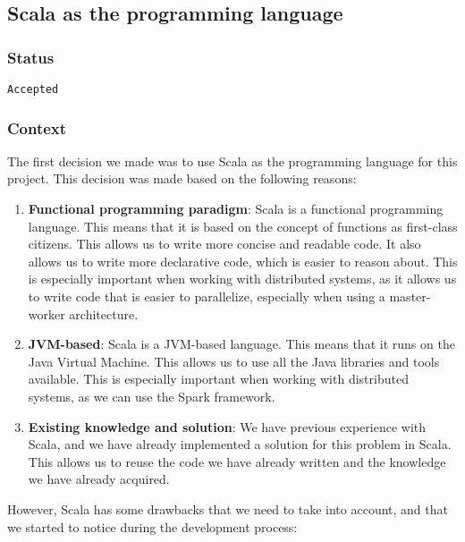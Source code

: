 \subsection{Scala as the programming language}

\subsubsection{Status}

\texttt{Accepted}

\subsubsection{Context}

The first decision we made was to use Scala as the programming language for this project. This decision was made based on the following reasons:

\begin{enumerate}
    \itemsep0.5em
    \item \textbf{Functional programming paradigm}: Scala is a functional programming language. This means that it is based on the concept of functions as first-class citizens. This allows us to write more concise and readable code. It also allows us to write more declarative code, which is easier to reason about. This is especially important when working with distributed systems, as it allows us to write code that is easier to parallelize, especially when using a master-worker architecture.
    \item \textbf{JVM-based}: Scala is a JVM-based language. This means that it runs on the Java Virtual Machine. This allows us to use all the Java libraries and tools available. This is especially important when working with distributed systems, as we can use the Spark framework.
    \item \textbf{Existing knowledge and solution}: We have previous experience with Scala, and we have already implemented a solution for this problem in Scala. This allows us to reuse the code we have already written and the knowledge we have already acquired.
\end{enumerate}

However, Scala has some drawbacks that we need to take into account, and that we started to notice during the development process:

